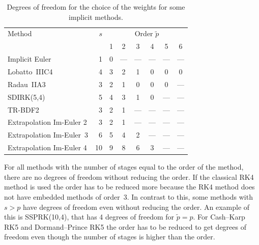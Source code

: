 \documentclass[a4paper]{article}
\numberwithin{equation}{section}
\theoremstyle{plain}
\theoremstyle{definition}
\numberwithin{theorem}{section}
\newcommand{\1}{\mathbbm{1}}
\newcommand{\pt}{{\tilde{p}}}
\begin{document}
\begin{table}[h!]
\centering   %
   \begin{tabular*}{\linewidth}{@{\extracolsep{\fill}}lr*6c@{}}
    \toprule
    Method & $s$ & \multicolumn{6}{c}{Order $\tilde p$} \\
    & & 1 & 2 & 3 & 4 & 5 & 6 \\
    \midrule
    Implicit Euler& 1&0& --- & --- & --- & --- & ---  \\
    Lobatto~IIIC4 \cite{chipman1971stable} & 4&3&2&1&0&0&0 \\
    Radau~IIA3 \cite{ehle1969pade} & 3&2&1&0&0&0& ---  \\
    SDIRK(5,4) \cite[eq. (6.18)]{hairer_solving_1996}& 5&4&3&1&0& --- & ---  \\
    TR-BDF2 \cite{bank1985transient} & 3&2&1& --- & --- & --- & ---  \\
    Extrapolation Im-Euler 2& 3&2&1& --- & --- & --- & ---  \\
    Extrapolation Im-Euler~3& 6&5&4&2& --- & --- & ---  \\
    Extrapolation Im-Euler 4& 10&9&8&6&3& --- & ---  \\
    \bottomrule
  \end{tabular*}
  \caption{Degrees of freedom for the choice of the weights for some implicit methods.} %
  \label{table:DOF_imp}
\end{table}


For all methods with the number of stages equal to the order of the method, there are no degrees of freedom without reducing the order.
If the classical RK4 method is used the order has to be reduced more because the RK4 method does not have embedded methods of order~3.
In contrast to this, some methods with $s > p$ have degrees of freedom even without reducing the order.
An example of this is SSPRK(10,4), that has 4 degrees of freedom for $\pt = p$.
For Cash--Karp RK5 and Dormand--Prince RK5 the order has to be reduced to get degrees of freedom even though the number of stages is higher than the order.
\end{document}
